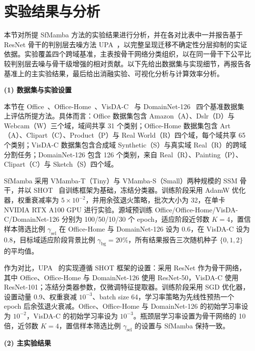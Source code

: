 \section{实验结果与分析}

\label{sec:chap2_experiments}

本节对所提 SfMamba 方法的实验结果进行分析，并在各对比表中一并报告基于 ResNet 骨干的判别层去噪方法 UPA~\cite{UPA}，以完整呈现迁移不确定性分层抑制的实证依据。实验覆盖四个跨域基准，主表按骨干网络分类组织，以在同一骨干下公平比较判别层去噪与骨干级增强的相对贡献。以下先给出数据集与实现细节，再报告各基准上的主实验结果，最后给出消融实验、可视化分析与计算效率分析。

\noindent\textbf{(1) 数据集与实验设置}

本节在 Office~\cite{saenko2010adapting}、Office-Home~\cite{venkateswara2017deep}、VisDA-C~\cite{peng2017visda} 与 DomainNet-126~\cite{peng2019moment} 四个基准数据集上评估所提方法。具体而言：Office 数据集包含 Amazon（A）、Dslr（D）与 Webcam（W）三个域，域间共享 31 个类别；Office-Home 数据集包含 Art（A）、Clipart（C）、Product（P）与 Real World（R）四个域，每个域共享 65 个类别；VisDA-C 数据集包含合成域 Synthetic（S）与真实域 Real（R）的跨域分割任务；DomainNet-126 包含 126 个类别，来自 Real（R）、Painting（P）、Clipart（C）与 Sketch（S）四个域。

SfMamba 采用 VMamba-T（Tiny）与 VMamba-S（Small）两种规模的 SSM 骨干，并以 SHOT~\cite{liang2021source} 自训练框架为基础，冻结分类器。训练阶段采用 AdamW 优化器，权重衰减率为 $5 \times 10^{-2}$，并用余弦退火策略，批次大小为 32，在单卡 NVIDIA RTX A100 GPU 进行实验。源域预训练 Office/Office-Home/VisDA-C/DomainNet-126 分别为 100/50/10/30 个 epoch，适应阶段近邻数 $K = 4$，置信样本筛选比例 $\gamma_{\text{sel}}$ 在 Office-Home 与 DomainNet-126 设为 0.6，在 VisDA-C 设为 0.8，目标域适应阶段背景比例 $\gamma_{\text{bg}} = 20\%$，所有结果报告三次随机种子 $\{0, 1, 2\}$ 的平均值。

作为对比，UPA~\cite{UPA} 的实现遵循 SHOT 框架的设置：采用 ResNet 作为骨干网络，其中 Office、Office-Home 与 DomainNet-126 使用 ResNet-50，VisDA-C 使用 ResNet-101；冻结分类器参数，仅微调特征提取器。训练阶段采用 SGD 优化器，设置动量 0.9、权重衰减 $10^{-3}$、batch size 64，学习率策略为先线性预热一个 epoch 后余弦退火衰减。Office、Office-Home 与 DomainNet-126 的初始学习率设为 $10^{-2}$，VisDA-C 的初始学习率设为 $10^{-3}$。瓶颈层学习率设置为骨干网络的 10 倍，近邻数 $K = 4$，置信样本筛选比例 $\gamma_{\text{sel}}$ 的设置与 SfMamba 保持一致。

\noindent\textbf{(2) 主实验结果}

